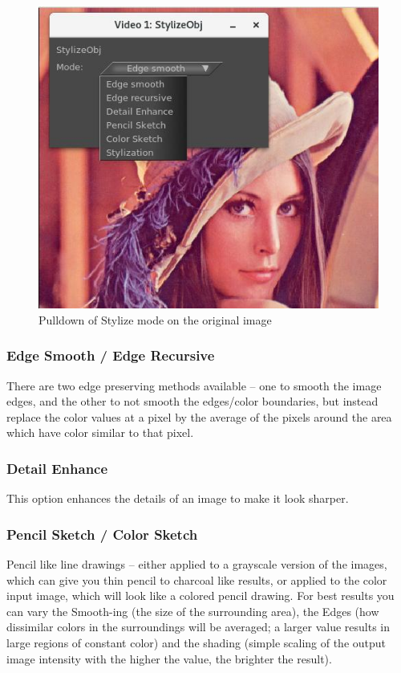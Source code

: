 \begin{figure}[htpb]
    \centering
    \includegraphics[width=0.8\linewidth]{images/stylizeobj01.png}
    \caption{Pulldown of Stylize mode on the original image}
    \label{fig:stylizeobj01}
\end{figure}

\subsubsection*{Edge Smooth / Edge Recursive}%
\label{ssub:edge_smooth_recursive}

There are two edge preserving methods available – one to smooth the image edges, and the other to not smooth the edges/color boundaries, but instead replace the color values at a pixel by the average of the pixels around the area which have color similar to that pixel.

\subsubsection*{Detail Enhance}%
\label{ssub:detail_enhance}

This option enhances the details of an image to make it look sharper.

\subsubsection*{Pencil Sketch / Color Sketch}%
\label{ssub:pencil_color_sketch}

Pencil like line drawings – either applied to a grayscale version of the images, which can give you thin pencil to charcoal like results, or applied to the color input image, which will look like a colored pencil drawing. For best results you can vary the Smooth-ing (the size of the surrounding area), the Edges (how dissimilar colors in the surroundings will be averaged; a larger value results in large regions of constant color) and the shading (simple scaling of the output image intensity with the higher the value, the brighter the result).

